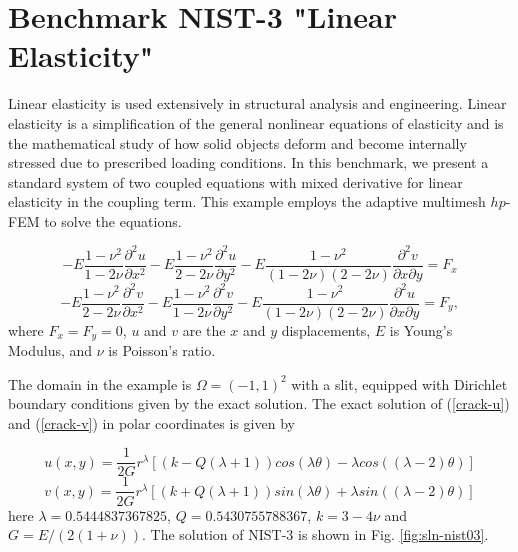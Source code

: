 \section{Benchmark NIST-3 "Linear Elasticity"}
\label{sec:bench-3}

Linear elasticity is used extensively in structural analysis
and engineering. Linear elasticity is a simplification
of the general nonlinear equations of elasticity and is the mathematical
study of how solid objects deform and become internally
stressed due to prescribed loading conditions.
In this benchmark, we present a standard system of two
coupled equations with mixed derivative for linear elasticity
in the coupling term. This example employs the adaptive multimesh $hp$-FEM
to solve the equations.

\begin{equation} \label{crack-u}
-E \frac{1-\nu^2}{1-2\nu} \frac{\partial^{2} u}{\partial x^{2}} - E\frac{1-\nu^2}{2-2 \nu} \frac{\partial^{2} u}{\partial y^{2}}
-E \frac{1-\nu^2}{(1-2\nu)(2-2\nu)} \frac{\partial^{2} v}{\partial x \partial y} = F_{x}
\end{equation}
\begin{equation} \label{crack-v}
-E \frac{1-\nu^2}{2-2\nu} \frac{\partial^{2} v}{\partial x^{2}} - E\frac{1-\nu^2}{1-2\nu} \frac{\partial^{2} v}{\partial y^{2}}
-E \frac{1-\nu^2}{(1-2\nu)(2-2\nu)} \frac{\partial^{2} u}{\partial x \partial y} = F_{y},
\end{equation}
where $F_{x} = F_{y} = 0$, $u$ and $v$ are the
$x$ and $y$ displacements, $E$ is Young's Modulus,
and $\nu$ is Poisson's ratio.

The domain in the example is $\Omega = (-1, 1)^2$ with a slit,
equipped with Dirichlet boundary conditions given by the
exact solution. The exact solution of (\ref{crack-u})
and (\ref{crack-v}) in polar coordinates is given by

\begin{equation}\label{exact-nist-3-u-1}
u(x, y) = \frac{1}{2G} r^{\lambda}[(k - Q(\lambda + 1))cos(\lambda \theta) - \lambda cos((\lambda - 2) \theta)]
\end{equation}
\begin{equation}\label{exact-nist-3-v-1}
v(x, y) = \frac{1}{2G} r^{\lambda}[(k + Q(\lambda + 1))sin(\lambda \theta) + \lambda sin((\lambda - 2) \theta)]
\end{equation}
here $\lambda = 0.5444837367825$, $Q = 0.5430755788367$,
$k = 3 - 4 \nu$ and $G = E / (2(1 + \nu))$.
The solution of NIST-3 is shown in Fig. \ref{fig:sln-nist03}.


